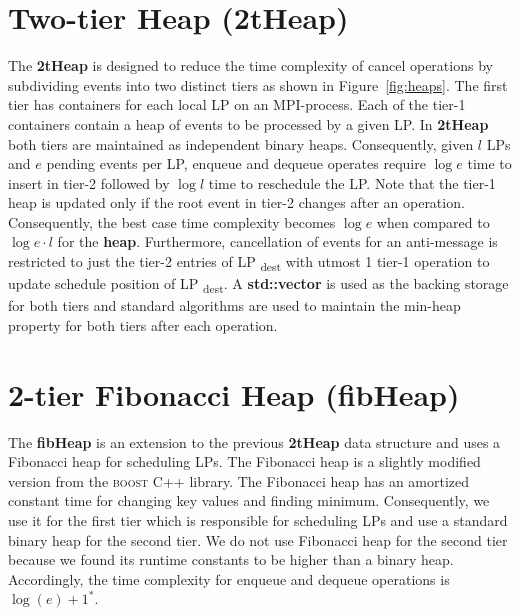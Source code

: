 \section{Two-tier Heap (2tHeap)} 
The \textbf{2tHeap} is designed to reduce the time complexity of cancel operations by subdividing events into two distinct tiers as shown in Figure~\ref{fig:heaps}. The first tier has containers for each local LP on an MPI-process. Each of the tier-1 containers contain a heap of events to be processed by a given LP. In \textbf{2tHeap} both tiers are maintained as independent binary heaps. Consequently, given $l$ LPs and $e$ pending events per LP, enqueue and dequeue operates require
$\log e$ time to insert in tier-2 followed by $\log l$ time to reschedule the LP. Note that the tier-1 heap is updated only if the root event in tier-2 changes after an operation. Consequently, the best case time complexity becomes $\log e$ when compared to $\log e\cdot l$ for the \textbf{heap}. Furthermore, cancellation of events for an anti-message is restricted to just the tier-2 entries of LP \textsubscript{dest}  with utmost 1 tier-1 operation to update schedule position of LP \textsubscript{dest}. A \textbf{std::vector} is used as the backing storage for both tiers and standard algorithms are used to maintain the min-heap property for both tiers after each operation.

\section{2-tier Fibonacci Heap (fibHeap)} 
The \textbf{fibHeap} is an extension to the previous \textbf{2tHeap} data structure and uses a Fibonacci heap for scheduling LPs. The Fibonacci heap is a slightly modified version from the \textsc{boost} C++ library. The Fibonacci heap has an amortized constant time for changing key values and finding minimum. Consequently, we use it for the first tier which is responsible for scheduling LPs and use a standard binary heap for the second tier.  We do not use Fibonacci heap for the second tier because we found its runtime constants to be higher than a binary heap.  Accordingly, the time complexity for enqueue and dequeue operations is $\log(e) + 1^{*}$.

